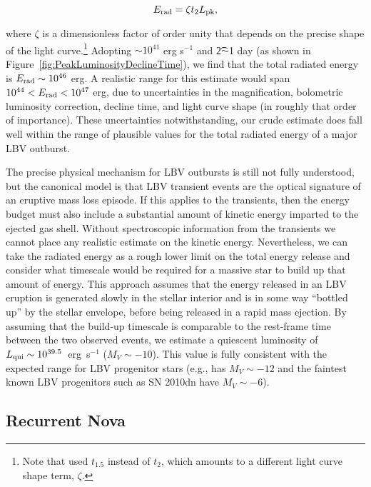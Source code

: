 \begin{equation}
  \label{eqn:Erad}
  E_{\rm rad} = \zeta \t2 \Lpk,
\end{equation}

\noindent where $\zeta$ is a dimensionless factor of order unity that depends on the
precise shape of the light curve.\footnote{Note that \cite{Smith:2011b} used $t_{1.5}$ instead of $t_2$, which amounts
  to a different light curve shape term, $\zeta$.}  Adopting
\Lpk$\sim10^{41}$ erg s$^{-1}$ and \t2$\sim$1 day (as shown in
Figure~\ref{fig:PeakLuminosityDeclineTime}), we find that the total
radiated energy is $E_{\rm rad}\sim10^{46}$ erg.  A realistic range
for this estimate would span $10^{44}<E_{\rm rad}<10^{47}$ erg, due to
uncertainties in the magnification, bolometric luminosity correction,
decline time, and light curve shape (in roughly that order of
importance). These uncertainties notwithstanding, our crude estimate
does fall well within the range of plausible values for the total
radiated energy of a major LBV outburst.

The precise physical mechanism for LBV outbursts is still not fully
understood\cite{Smith:2006,Woosley:2007,Dessart:2010}, but the
canonical model is that LBV transient events are the optical signature
of an eruptive mass loss episode.  If this applies to the \spock
transients, then the energy budget must also include a substantial
amount of kinetic energy imparted to the ejected gas shell. Without
spectroscopic information from the \spock transients we cannot place
any realistic estimate on the kinetic energy. Nevertheless, we can
take the radiated energy as a rough lower limit on the total energy
release and consider what timescale would be required for a massive
star to build up that amount of energy. This approach assumes that the
energy released in an LBV eruption is generated slowly in the stellar
interior and is in some way ``bottled up'' by the stellar envelope,
before being released in a rapid mass ejection.  By assuming that the
build-up timescale is comparable to the rest-frame time between the
two observed events, we estimate a quiescent luminosity of $L_{\rm
  qui}\sim10^{39.5}$~erg~s$^{-1}$ ($M_V\sim-10$).  This value is fully
consistent with the expected range for LBV progenitor stars (e.g.,
\etacar has $M_V\sim-12$ and the faintest known LBV progenitors such
as SN 2010dn have $M_V\sim-6$).


\subsection{Recurrent Nova}\label{sec:RNe}

